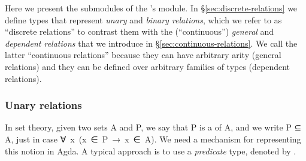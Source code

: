 Here we present the submodules of the \agdaualib's  module. In \S\ref{sec:discrete-relations} we define types that represent \emph{unary} and \emph{binary relations}, which we refer to as ``discrete relations'' to contrast them with the (``continuous'') \emph{general} and \emph{dependent relations} that we introduce in \S\ref{sec:continuous-relations}. We call the latter ``continuous relations'' because they can have arbitrary arity (general relations) and they can be defined over arbitrary families of types (dependent relations).




\subsubsection{Unary relations}

In set theory, given two sets \ab A and \ab P, we say that \ab P is a  of \ab A, and we write \ab P \af ⊆ \ab A, just in case \as ∀~\ab x~(\ab x~\af ∈~\ab P~\as →~\ab x~\af ∈~\ab A). We need a mechanism for representing this notion in Agda. A typical approach is to use a \emph{predicate} type, denoted by .

